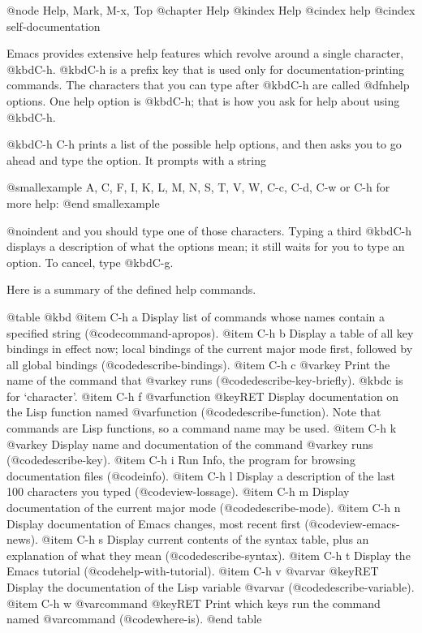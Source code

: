 {{{{{@node Help, Mark, M-x, Top
@chapter Help
@kindex Help
@cindex help
@cindex self-documentation

  Emacs provides extensive help features which revolve around a single
character, @kbd{C-h}.  @kbd{C-h} is a prefix key that is used only for
documentation-printing commands.  The characters that you can type after
@kbd{C-h} are called @dfn{help options}.  One help option is @kbd{C-h};
that is how you ask for help about using @kbd{C-h}.

  @kbd{C-h C-h} prints a list of the possible help options, and then asks
you to go ahead and type the option.  It prompts with a string

@smallexample
A, C, F, I, K, L, M, N, S, T, V, W, C-c, C-d, C-w or C-h for more help: 
@end smallexample

@noindent
and you should type one of those characters.  Typing a third @kbd{C-h}
displays a description of what the options mean; it still waits for you to
type an option.  To cancel, type @kbd{C-g}.

  Here is a summary of the defined help commands.

@table @kbd
@item C-h a
Display list of commands whose names contain a specified string
(@code{command-apropos}).
@item C-h b
Display a table of all key bindings in effect now; local bindings of
the current major mode first, followed by all global bindings
(@code{describe-bindings}).
@item C-h c @var{key}
Print the name of the command that @var{key} runs (@code{describe-key-briefly}).
@kbd{c} is for `character'.
@item C-h f @var{function} @key{RET}
Display documentation on the Lisp function named @var{function}
(@code{describe-function}).  Note that commands are Lisp functions, so
a command name may be used.
@item C-h k @var{key}
Display name and documentation of the command @var{key} runs (@code{describe-key}).
@item C-h i
Run Info, the program for browsing documentation files (@code{info}).
@item C-h l
Display a description of the last 100 characters you typed
(@code{view-lossage}).
@item C-h m
Display documentation of the current major mode (@code{describe-mode}).
@item C-h n
Display documentation of Emacs changes, most recent first
(@code{view-emacs-news}).
@item C-h s
Display current contents of the syntax table, plus an explanation of
what they mean (@code{describe-syntax}).
@item C-h t
Display the Emacs tutorial (@code{help-with-tutorial}).
@item C-h v @var{var} @key{RET}
Display the documentation of the Lisp variable @var{var}
(@code{describe-variable}).
@item C-h w @var{command} @key{RET}
Print which keys run the command named @var{command} (@code{where-is}).
@end table

}}}}}

